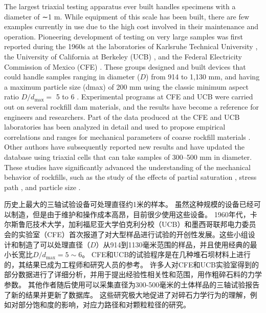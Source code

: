 \begin{ParaColumn}
    The largest triaxial testing apparatus ever built handles specimens with a diameter of ∼1 m. While equipment of this scale has been built, there are few examples currently in use due to the high cost involved in their maintenance and operation. Pioneering development of testing on very large samples was first reported during the 1960s at the laboratories of Karlsruhe Technical University \citep{Leussink1960}, the University of California at Berkeley (UCB) \citep{Marachi1969}, and the Federal Electricity Commission of Mexico (CFE) \citep{Marsal1965}. These groups designed and built devices that could handle samples ranging in diameter ($D$) from 914 to 1,130 mm, and having a maximum particle size (dmax) of 200 mm using the classic minimum aspect ratio $D/d_{\max}=$ 5 to 6 \citep{Holtz19561}. Experimental programs at CFE and UCB were carried out on several rockfill dam materials, and the results have become a reference for engineers and researchers. Part of the data produced at the CFE and UCB laboratories has been analyzed in detail and used to propose empirical correlations and ranges for mechanical parameters of coarse rockfill materials \citep{Leps19701159,Barton1981873,Hunter2003909}. Other authors have subsequently reported new results and have updated the database \citep{Charles1980353,Al-Hussaini1983706,Matsuoka1998275,Hunter2003909,Varadarajan2003206,Xiao2014a,Xiao2014b} using triaxial cells that can take samples of 300–500 mm in diameter. These studies have significantly advanced the understanding of the mechanical behavior of rockfills, such as the study of the effects of partial saturation \citep{Oldecop2003289,Alonso2016455}, stress path \citep{Chávez2003215,Xiao2016}, and particle size \citep{Verdugo2007243,Hu2011,Ovalle20201}.

    \switchcolumn

    历史上最大的三轴试验设备可处理直径约1米的样本。 虽然这种规模的设备已经可以制造，但是由于维护和操作成本高昂，目前很少使用这些设备。  1960年代，卡尔斯鲁厄技术大学\citep{Leussink1960}，加利福尼亚大学伯克利分校（UCB）\citep{Marachi1969}和墨西哥联邦电力委员会的实验室（CFE）\citep{Marsal1965}首次报道了对大型样品进行试验的开创性发展。这些小组设计和制造了可以处理直径（$D$）从914到1130毫米范围的样品，并且使用经典的最小长宽比$D/d_{\max}=5\sim 6$\citep{Holtz19561}。 CFE和UCB的试验程序是在几种堆石坝材料上进行的，其结果已成为工程师和研究人员的参考。 许多人对CFE和UCB实验室得到的部分数据进行了详细分析，并用于提出经验性相关性和范围，用作粗碎石料的力学参数\citep{Leps19701159,Barton1981873,Hunter2003909}。 其他作者随后使用可以采集直径为300-500毫米的土体样品的三轴试验报告了新的结果并更新了数据库\citep{Charles1980353,Al-Hussaini1983706,Matsuoka1998275,Hunter2003909,Varadarajan2003206,Xiao2014a,Xiao2014b}。 这些研究极大地促进了对碎石力学行为的理解，例如对部分饱和度的影响\citep{Oldecop2003289,Alonso2016455}，对应力路径\citep{Chávez2003215,Xiao2016}和对颗粒粒径\citep{Verdugo2007243,Hu2011,Ovalle20201}的研究。


\end{ParaColumn}
